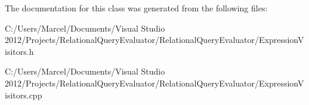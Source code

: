 The documentation for this class was generated from the following files\+:\begin{DoxyCompactItemize}
\item 
C\+:/\+Users/\+Marcel/\+Documents/\+Visual Studio 2012/\+Projects/\+Relational\+Query\+Evaluator/\+Relational\+Query\+Evaluator/Expression\+Visitors.\+h\item 
C\+:/\+Users/\+Marcel/\+Documents/\+Visual Studio 2012/\+Projects/\+Relational\+Query\+Evaluator/\+Relational\+Query\+Evaluator/Expression\+Visitors.\+cpp\end{DoxyCompactItemize}
